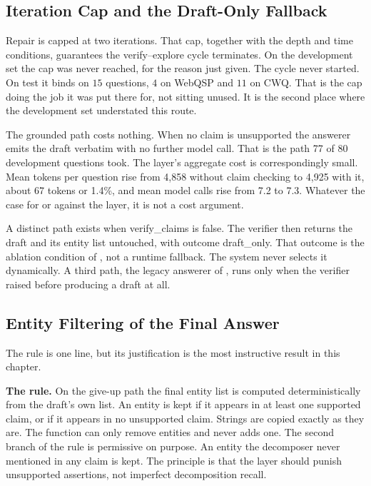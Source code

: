 \subsection{Iteration Cap and the Draft-Only Fallback}

Repair is capped at two iterations. That cap, together with the depth and
time conditions, guarantees the verify--explore cycle
terminates. On the development set the cap was never reached, for the reason
just given. The cycle never started. On test it binds on $15$ questions, $4$ on
WebQSP and $11$ on CWQ. That is the cap doing the job it was put there for, not
sitting unused. It is the second place where the development set understated
this route.

The grounded path costs nothing. When no claim is unsupported the answerer emits
the draft verbatim with no further model call. That is the path 77 of 80
development questions took. The layer's aggregate cost is correspondingly small.
Mean tokens per question rise from 4{,}858 without claim checking to 4{,}925
with it, about 67 tokens or 1.4\%, and mean model calls rise from 7.2 to 7.3.
Whatever the case for or against the layer, it is not a cost argument.

A distinct path exists when \textsf{verify\_claims} is false. The verifier then
returns the draft and its entity list untouched, with outcome
\textsf{draft\_only}. That outcome is the ablation condition of
, not a runtime fallback. The system never selects
it dynamically. A third path, the legacy answerer of , runs
only when the verifier raised before producing a draft at all.

\subsection{Entity Filtering of the Final Answer}\label{sec:entity-filtering}

The rule is one line, but its justification is the most instructive result
in this chapter.

\textbf{The rule.} On the give-up path the final entity list is computed
deterministically from the draft's own list. An entity is kept if it appears in
at least one supported claim, or if it appears in no unsupported claim. Strings
are copied exactly as they are. The function can only remove entities and never
adds one. The second branch of the rule is permissive on purpose. An entity the
decomposer never mentioned in any claim is kept. The principle is that the layer
should punish unsupported assertions, not imperfect decomposition recall.

